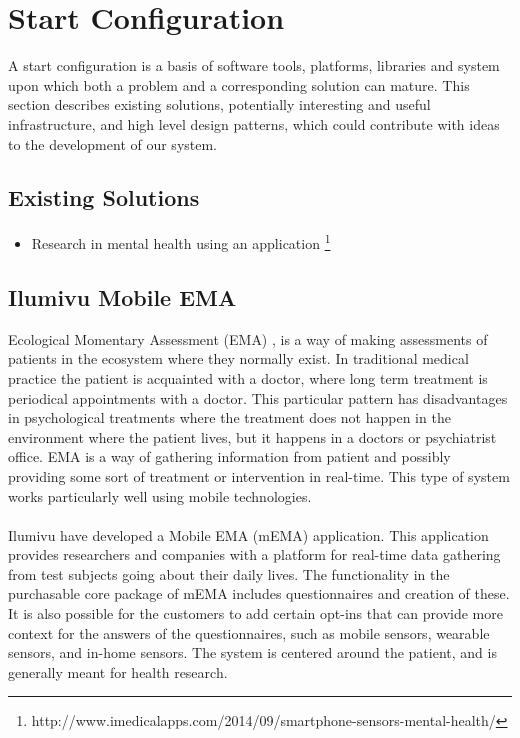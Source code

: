 
\section{Start Configuration}
\label{sec:start_configuration}

A start configuration is a basis of software tools, platforms, libraries and system upon which both a problem and a corresponding solution can mature. This section describes existing solutions, potentially interesting and useful infrastructure, and high level design patterns, which could contribute with ideas to the development of our system.

\subsection{Existing Solutions} %
\label{sub:existing_solutions}


\begin{itemize}
    \item Research in mental health using an application \footnote{http://www.imedicalapps.com/2014/09/smartphone-sensors-mental-health/}
\end{itemize}

\subsection{Ilumivu Mobile EMA}
\label{sub:ilumivu_mobile_ema}

Ecological Momentary Assessment (EMA) \parencite{shiffman2008ecological}, is a way of making assessments of patients in the ecosystem where they normally exist. In traditional medical practice the patient is acquainted with a doctor, where long term treatment is periodical appointments with a doctor. This particular pattern has disadvantages in psychological treatments where the treatment does not happen in the environment where the patient lives, but it happens in a doctors or psychiatrist office. EMA is a way of gathering information from patient and possibly providing some sort of treatment or intervention in real-time. This type of system works particularly well using mobile technologies.
\\\\
Ilumivu have developed a Mobile EMA (mEMA) application. This application provides researchers and companies with a platform for real-time data gathering from test subjects going about their daily lives. The functionality in the purchasable core package of mEMA includes questionnaires and creation of these. It is also possible for the customers to add certain opt-ins that can provide more context for the answers of the questionnaires, such as mobile sensors, wearable sensors, and in-home sensors. The system is centered around the patient, and is generally meant for health research.

